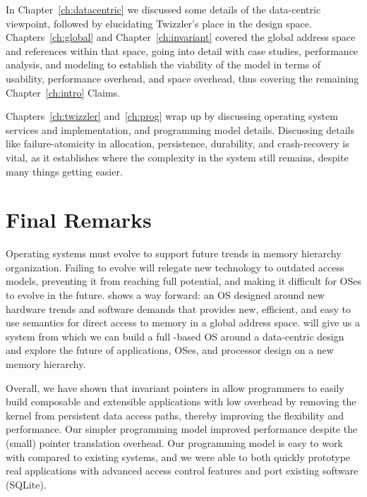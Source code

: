 In Chapter~\ref{ch:datacentric} we discussed some details of the data-centric viewpoint, followed by elucidating
Twizzler's place in the design space. Chapters~\ref{ch:global} and Chapter~\ref{ch:invariant} covered the global address
space and references within that space, going into detail with case studies, performance analysis, and modeling to
establish the viability of the model in terms of usability, performance overhead, and space overhead, thus covering the
remaining Chapter~\ref{ch:intro} Claims.

Chapters~\ref{ch:twizzler} and~\ref{ch:prog} wrap up by discussing operating system services and implementation, and
programming model details. Discussing details like failure-atomicity in allocation, persistence, durability, and
crash-recovery is vital, as it establishes where the complexity in the system still remains, despite many things getting
easier.


\section{Final Remarks}



Operating systems must evolve to support future trends in memory hierarchy
organization. Failing to evolve will relegate new technology to
outdated access models, preventing it from reaching full potential,
and making it difficult for OSes to evolve in the
future. \Twizzler shows a way forward: an
OS designed around new hardware trends and software demands that provides
new, efficient, and easy to use semantics for direct access to memory in a global address space.
\Twizzler will give us a system from which
we can build a full \NVM-based OS around a data-centric design and explore the future of applications, OSes, and
processor design on a new memory hierarchy.

Overall, we have shown that invariant pointers in \Twizzler allow programmers to easily build
composable and extensible applications with low overhead
by removing the kernel from persistent data access paths,
thereby improving the flexibility and performance.
Our simpler programming model improved performance despite the (small)
pointer translation overhead.
Our programming model is easy to work with
compared to existing systems, and we were able to both quickly prototype real
applications with advanced access control features and port existing software (SQLite).

